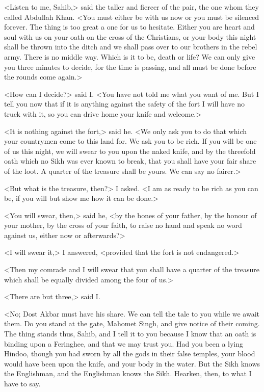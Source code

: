 <Listen to me, Sahib,> said the taller and fiercer of the pair, the one whom they called Abdullah Khan. <You must either be with us now or you must be silenced forever. The thing is too great a one for us to hesitate. Either you are heart and soul with us on your oath on the cross of the Christians, or your body this night shall be thrown into the ditch and we shall pass over to our brothers in the rebel army. There is no middle way. Which is it to be, death or life? We can only give you three minutes to decide, for the time is passing, and all must be done before the rounds come again.>

<How can I decide?> said I\@. <You have not told me what you want of me. But I tell you now that if it is anything against the safety of the fort I will have no truck with it, so you can drive home your knife and welcome.>

<It is nothing against the fort,> said he. <We only ask you to do that which your countrymen come to this land for. We ask you to be rich. If you will be one of us this night, we will swear to you upon the naked knife, and by the threefold oath which no Sikh was ever known to break, that you shall have your fair share of the loot. A quarter of the treasure shall be yours. We can say no fairer.>

<But what is the treasure, then?> I asked. <I am as ready to be rich as you can be, if you will but show me how it can be done.>

<You will swear, then,> said he, <by the bones of your father, by the honour of your mother, by the cross of your faith, to raise no hand and speak no word against us, either now or afterwards?>

<I will swear it,> I answered, <provided that the fort is not endangered.>

<Then my comrade and I will swear that you shall have a quarter of the treasure which shall be equally divided among the four of us.>

<There are but three,> said I\@.

<No; Dost Akbar must have his share. We can tell the tale to you while we await them. Do you stand at the gate, Mahomet Singh, and give notice of their coming. The thing stands thus, Sahib, and I tell it to you because I know that an oath is binding upon a Feringhee, and that we may trust you. Had you been a lying Hindoo, though you had sworn by all the gods in their false temples, your blood would have been upon the knife, and your body in the water. But the Sikh knows the Englishman, and the Englishman knows the Sikh. Hearken, then, to what I have to say.

